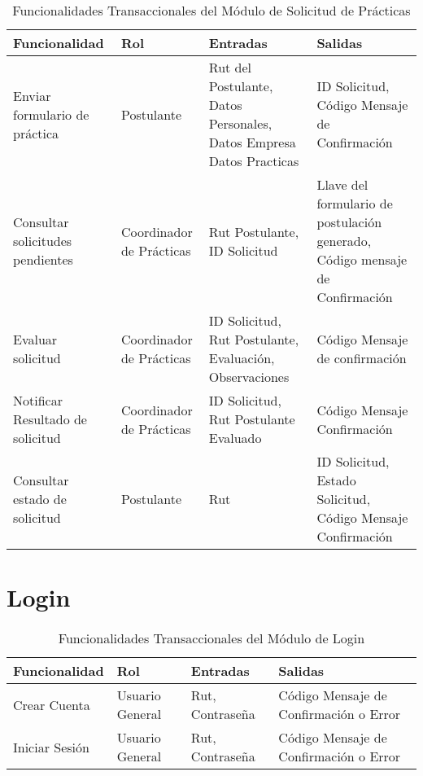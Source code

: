 \documentclass{article}
\begin{document}
\begin{table}[h!]
\centering
\caption{Funcionalidades Transaccionales del Módulo de Solicitud de Prácticas}

\begin{tabular}{|l|p{2.0cm}|p{4.0cm}|p{4.0cm}|}
\hline
Funcionalidad           & Rol                                   & Entradas & Salidas              \\ \hline
Enviar formulario de práctica      & Postulante                 & Rut del Postulante, Datos Personales, Datos Empresa Datos Practicas & ID Solicitud, Código Mensaje de Confirmación \\ \hline
Consultar solicitudes pendientes       & Coordinador de Prácticas  & Rut Postulante, ID Solicitud & Llave del formulario de postulación generado, Código mensaje de Confirmación   \\ \hline
Evaluar solicitud    & Coordinador de Prácticas                 & ID Solicitud, Rut Postulante, Evaluación, Observaciones  & Código Mensaje de confirmación  \\ \hline
Notificar Resultado de solicitud & Coordinador de Prácticas     & ID Solicitud, Rut Postulante Evaluado & Código Mensaje Confirmación  \\ \hline
Consultar estado de solicitud & Postulante                      & Rut &  ID Solicitud, Estado Solicitud, Código Mensaje Confirmación  \\ \hline
\end{tabular}
\end{table}

\section{Login}

\begin{table}[h!]
\centering
\caption{Funcionalidades Transaccionales del Módulo de Login}

\begin{tabular}{|l|p{2.0cm}|p{4.0cm}|p{4.0cm}|}
\hline
Funcionalidad           & Rol  & Entradas & Salidas                 \\ \hline
Crear Cuenta      & Usuario General & Rut, Contraseña & Código Mensaje de Confirmación o Error\\ \hline
Iniciar Sesión        & Usuario General & Rut, Contraseña & Código Mensaje de Confirmación o Error\\ \hline
\end{tabular}
\end{table}
\end{document}
